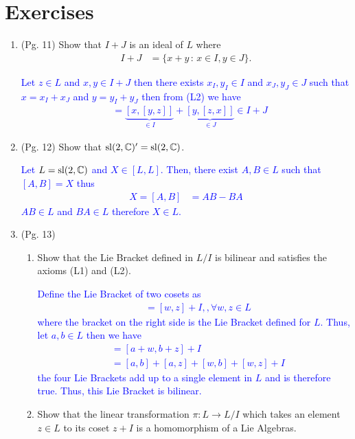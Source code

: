 \documentclass[12pt,a4paper]{report}
\newcommand{\BLUE}[1]{\textcolor{blue}{#1}}
\newcommand{\SL}{\operatorname{sl}}
\begin{document}
\section{Exercises}

\begin{enumerate}[label=2.\arabic*]

\item (Pg. 11) Show that $I+J$ is an ideal of $L$ where
\begin{align*}
	I+J &=\{x+y\,:\, x \in I, y\in J\}.
\end{align*}

\BLUE{Let $z \in L$ and $x, y \in I+J$ then there exists $x_I, y_I \in I$ and $x_J, y_J \in J$ such that $x=x_I+x_J$ and $y=y_I+y_J$  then from (L2) we have
\begin{align*}
	[\underbrace{[y,x]}_{\in I+J}, z] &= \underbrace{[x, [y,z]]}_{\in I} + \underbrace{[y,[z,x]]}_{\in J}  \in I+J
\end{align*}
}

\item (Pg. 12) Show that $\SL(2, \C)' = \SL(2, \C)$.

\BLUE{Let $L = \SL(2, \C)$ and $X \in [L, L]$.  Then, there exist $A,B \in L$ such that $[A,B] = X$ thus
\begin{align*}
	X = [A,B] &= AB - BA
\end{align*}$AB \in L$ and $BA \in L$ therefore $X \in L$.
}

\item (Pg. 13) \begin{enumerate}[label=(\roman*)]
	\item Show that the Lie Bracket defined in $L/I$ is bilinear and satisfies the axioms (L1) and (L2).
	
	\BLUE{Define the Lie Bracket of two cosets as \begin{align*}
		[w+I, z+I] &= [w,z]+I,, \forall w,z \in L
	\end{align*}where the bracket on the right side is the Lie Bracket defined for $L$.  Thus, let $a,b \in L$ then we have 
	\begin{align*}
		[a+w+I, b+z+I] &= [a+w,b+z]+I \\
		&= [a,b]+[a,z]+[w,b]+[w,z]+I
	\end{align*}the four Lie Brackets add up to a single element in $L$ and is therefore true.  Thus, this Lie Bracket is bilinear.
	}	
	
	\item Show that the linear transformation $\pi : L \to L/I$ which takes an element $z \in L$ to its coset $z+I$ is a homomorphism of a Lie Algebras.
	

\end{enumerate}
\end{enumerate}
\end{document}
